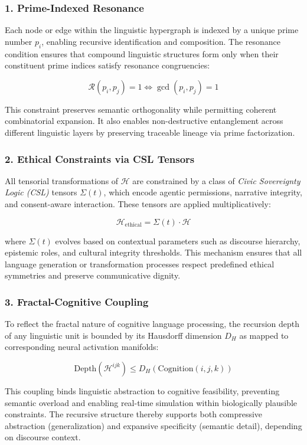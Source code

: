\documentclass{article}
\theoremstyle{plain}
\theoremstyle{claimstyle}
\begin{document}
\subsubsection*{1. Prime-Indexed Resonance}

Each node or edge within the linguistic hypergraph is indexed by a unique prime number $p_i$, enabling recursive identification and composition. The resonance condition ensures that compound linguistic structures form only when their constituent prime indices satisfy resonance congruencies:

\[
\mathcal{R}(p_i, p_j) = 1 \iff \gcd(p_i, p_j) = 1
\]

This constraint preserves semantic orthogonality while permitting coherent combinatorial expansion. It also enables non-destructive entanglement across different linguistic layers by preserving traceable lineage via prime factorization.

\subsubsection*{2. Ethical Constraints via CSL Tensors}

All tensorial transformations of $\mathcal{H}$ are constrained by a class of \textit{Civic Sovereignty Logic (CSL)} tensors $\Sigma(t)$, which encode agentic permissions, narrative integrity, and consent-aware interaction. These tensors are applied multiplicatively:

\[
\mathcal{H}_{\text{ethical}} = \Sigma(t) \cdot \mathcal{H}
\]

where $\Sigma(t)$ evolves based on contextual parameters such as discourse hierarchy, epistemic roles, and cultural integrity thresholds. This mechanism ensures that all language generation or transformation processes respect predefined ethical symmetries and preserve communicative dignity.

\subsubsection*{3. Fractal-Cognitive Coupling}

To reflect the fractal nature of cognitive language processing, the recursion depth of any linguistic unit is bounded by its Hausdorff dimension $D_H$ as mapped to corresponding neural activation manifolds:

\[
\text{Depth}(\mathcal{H}^{ijk}) \leq D_H(\text{Cognition}(i, j, k))
\]

This coupling binds linguistic abstraction to cognitive feasibility, preventing semantic overload and enabling real-time simulation within biologically plausible constraints. The recursive structure thereby supports both compressive abstraction (generalization) and expansive specificity (semantic detail), depending on discourse context.
\end{document}
